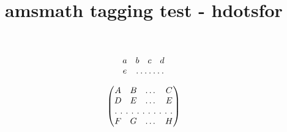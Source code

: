 \documentclass{article}
\title{amsmath tagging test - hdotsfor}
\begin{document}
\[
\begin{matrix}
a&b&c&d\\
e&\hdotsfor{3}
\end{matrix}
\]

\[
\begin{pmatrix}
A&B&\dots&C\\
D&E&\dots&E\\
\hdotsfor[2]{4}\\
F&G&\dots&H
\end{pmatrix}
\]
\end{document}
